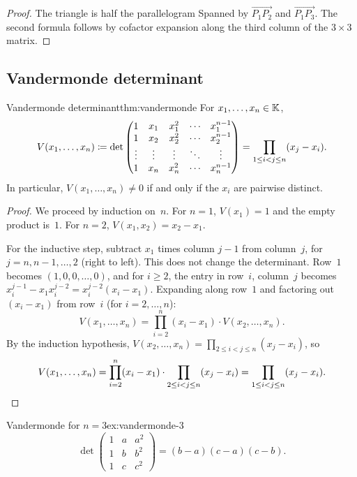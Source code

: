 \begin{proof}
The triangle is half the parallelogram Spanned by
$\overrightarrow{P_1 P_2}$ and $\overrightarrow{P_1 P_3}$.
The second formula follows by cofactor expansion along the third
column of the $3\times 3$ matrix.
\end{proof}

\subsection{Vandermonde determinant}\label{subsec:vandermonde}

\begin{theorem}{Vandermonde determinant}{thm:vandermonde}
For $x_1,\ldots,x_n\in{\mathbb{K}}$,
\[
  V(x_1,\ldots,x_n) \coloneqq
  \det\begin{pmatrix}
    1 & x_1 & x_1^2 & \cdots & x_1^{n-1} \\
    1 & x_2 & x_2^2 & \cdots & x_2^{n-1} \\
    \vdots & \vdots & \vdots & \ddots & \vdots \\
    1 & x_n & x_n^2 & \cdots & x_n^{n-1}
  \end{pmatrix}
  = \prod_{1\leq i < j \leq n} (x_j - x_i).
\]
In particular, $V(x_1,\ldots,x_n)\neq 0$ if and only if the
$x_i$ are pairwise distinct.
\end{theorem}

\begin{proof}
We proceed by induction on~$n$. For $n=1$, $V(x_1)=1$ and the empty
product is~$1$. For $n=2$, $V(x_1,x_2) = x_2 - x_1$.

For the inductive step, subtract $x_1$ times column $j-1$ from
column~$j$, for $j=n,n-1,\ldots,2$ (right to left). This does not
change the determinant. Row~$1$ becomes $(1,0,0,\ldots,0)$, and for
$i\geq 2$, the entry in row~$i$, column~$j$ becomes
$x_i^{j-1}-x_1 x_i^{j-2} = x_i^{j-2}(x_i - x_1)$.
Expanding along row~$1$ and factoring out $(x_i-x_1)$ from row~$i$
(for $i=2,\ldots,n$):
\[
  V(x_1,\ldots,x_n) = \prod_{i=2}^n (x_i-x_1)\cdot V(x_2,\ldots,x_n).
\]
By the induction hypothesis,
$V(x_2,\ldots,x_n) = \prod_{2\leq i<j\leq n}(x_j-x_i)$, so
\[
  V(x_1,\ldots,x_n)
  = \prod_{i=2}^n (x_i-x_1)\cdot\prod_{2\leq i<j\leq n}(x_j-x_i)
  = \prod_{1\leq i<j\leq n}(x_j-x_i). \qedhere
\]
\end{proof}

\begin{example}{Vandermonde for $n=3$}{ex:vandermonde-3}
\[
  \det\begin{pmatrix}1 & a & a^2 \\ 1 & b & b^2 \\ 1 & c & c^2
  \end{pmatrix}
  = (b-a)(c-a)(c-b).
\]
\end{example}

